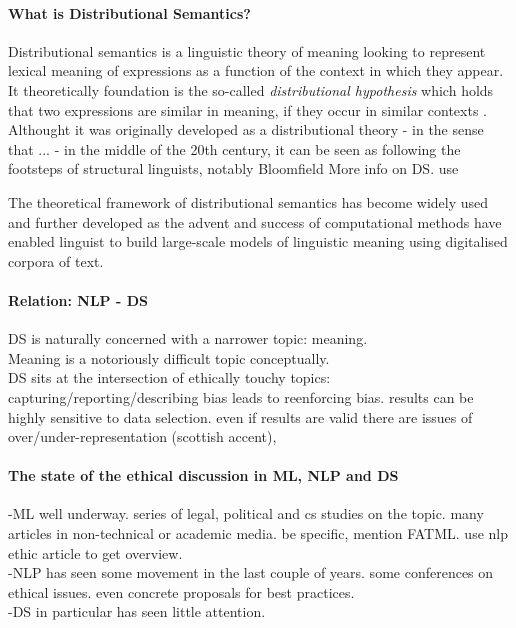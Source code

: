 \documentclass{article}
\begin{document}
\paragraph{What is Distributional Semantics?}
Distributional semantics is a linguistic theory of meaning looking to represent lexical meaning of expressions as a function of the context in which they appear. It theoretically foundation is the so-called \emph{distributional hypothesis} which holds that two expressions are similar in meaning, if they occur in similar contexts \cite{harris1954distributional}.
Althought it was originally developed as a distributional theory - in the sense that ... - in the middle of the 20th century, it can be seen as following the footsteps of structural linguists, notably Bloomfield \cite{bloomfield}
More info on DS. use \cite{boleda2016formal}

The theoretical framework of distributional semantics has become widely used and further developed as the advent and success of computational methods have enabled linguist to build large-scale models of linguistic meaning using digitalised corpora of text. 

\paragraph{Relation: NLP - DS}
DS is naturally concerned with a narrower topic: meaning.\\
Meaning is a notoriously difficult topic conceptually.\\
DS sits at the intersection of ethically touchy topics: capturing/reporting/describing bias leads to reenforcing bias. results can be highly sensitive to data selection. even if results are valid there are issues of over/under-representation (scottish accent),
 
\paragraph{The state of the ethical discussion in ML, NLP and DS}
-ML well underway. series of legal, political and cs studies on the topic. many articles in non-technical or academic media. be specific, mention FATML. use nlp ethic article to get overview.\\
-NLP has seen some movement in the last couple of years. some conferences on ethical issues. even concrete proposals for best practices.\\
-DS in particular has seen little attention.
\end{document}
